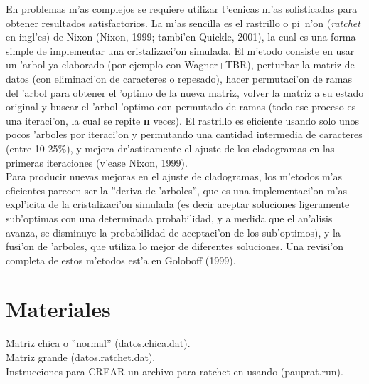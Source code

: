 En problemas m'as complejos se requiere utilizar t'ecnicas m'as sofisticadas para obtener resultados satisfactorios. La m'as sencilla es el rastrillo o pi~n'on (\textit{ratchet} en ingl'es) de Nixon (Nixon, 1999; tambi'en Quickle, 2001), la cual es una forma simple de implementar una cristalizaci'on simulada. El m'etodo consiste en usar un 'arbol ya elaborado (por ejemplo con Wagner+TBR), perturbar la matriz de datos (con eliminaci'on de caracteres o repesado), hacer permutaci'on de ramas del 'arbol para obtener el 'optimo de la nueva matriz, volver la matriz a su estado original y buscar el 'arbol 'optimo con permutado de ramas (todo ese proceso es una iteraci'on, la cual se repite \textbf{n} veces). El rastrillo es eficiente usando solo unos pocos 'arboles por iteraci'on y permutando una cantidad intermedia de caracteres (entre 10-25\%), y mejora dr'asticamente el ajuste de los cladogramas en las primeras iteraciones (v'ease Nixon, 1999).\\
Para producir nuevas mejoras en el ajuste de cladogramas, los m'etodos m'as eficientes parecen ser la ''deriva de 'arboles'', que es una implementaci'on m'as expl'icita de la cristalizaci'on simulada (es decir aceptar soluciones ligeramente sub'optimas con una determinada probabilidad, y a medida que el an'alisis avanza, se disminuye la probabilidad de aceptaci'on de los sub'optimos), y la fusi'on de 'arboles, que utiliza lo mejor de diferentes soluciones. Una revisi'on completa de estos m'etodos est'a en Goloboff (1999).
\section{Materiales}
\noindent
Matriz chica o ''normal'' (datos.chica.dat).\\
Matriz grande (datos.ratchet.dat).\\
Instrucciones para CREAR un archivo para ratchet en  usando  (pauprat.run).
